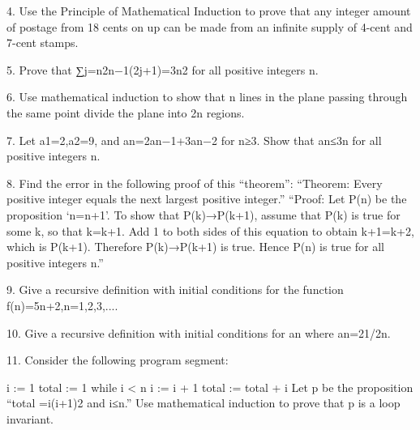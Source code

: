 \documentclass{article}
\begin{document}
\begin{large}
4. Use the Principle of Mathematical Induction to prove that any integer amount of postage from 18 cents on up can be made from an infinite supply of 4-cent and 7-cent stamps.

5. Prove that ∑j=n2n−1(2j+1)=3n2 for all positive integers n. 

6. Use mathematical induction to show that n lines in the plane passing through the same point divide the plane into 2n regions.

7. Let a1=2,a2=9, and an=2an−1+3an−2 for n≥3. Show that an≤3n for all positive integers n. 

8. Find the error in the following proof of this “theorem”: “Theorem: Every positive integer equals the next largest positive integer.” “Proof: Let P(n) be the proposition ‘n=n+1’. To show that P(k)→P(k+1), assume that P(k) is true for some k, so that k=k+1. Add 1 to both sides of this equation to obtain k+1=k+2, which is P(k+1). Therefore P(k)→P(k+1) is true. Hence P(n) is true for all positive integers n.”

9. Give a recursive definition with initial conditions for the function f(n)=5n+2,n=1,2,3,....

10. Give a recursive definition with initial conditions for {an} where an=21/2n.

11. Consider the following program segment:

i := 1
total := 1 
while i < n
  i := i + 1
  total := total + i
Let p be the proposition “total =i(i+1)2 and i≤n.” Use mathematical induction to prove that p is a loop invariant.

\end{large}
\end{document}
